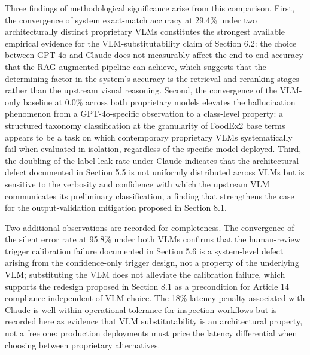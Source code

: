 Three findings of methodological significance arise from this comparison. First, the convergence of system exact-match accuracy at 29.4\% under two architecturally distinct proprietary VLMs constitutes the strongest available empirical evidence for the VLM-substitutability claim of Section 6.2: the choice between GPT-4o and Claude does not measurably affect the end-to-end accuracy that the RAG-augmented pipeline can achieve, which suggests that the determining factor in the system's accuracy is the retrieval and reranking stages rather than the upstream visual reasoning. Second, the convergence of the VLM-only baseline at 0.0\% across both proprietary models elevates the hallucination phenomenon from a GPT-4o-specific observation to a class-level property: a structured taxonomy classification at the granularity of FoodEx2 base terms appears to be a task on which contemporary proprietary VLMs systematically fail when evaluated in isolation, regardless of the specific model deployed. Third, the doubling of the label-leak rate under Claude indicates that the architectural defect documented in Section 5.5 is not uniformly distributed across VLMs but is sensitive to the verbosity and confidence with which the upstream VLM communicates its preliminary classification, a finding that strengthens the case for the output-validation mitigation proposed in Section 8.1.

Two additional observations are recorded for completeness. The convergence of the silent error rate at 95.8\% under both VLMs confirms that the human-review trigger calibration failure documented in Section 5.6 is a system-level defect arising from the confidence-only trigger design, not a property of the underlying VLM; substituting the VLM does not alleviate the calibration failure, which supports the redesign proposed in Section 8.1 as a precondition for Article 14 compliance independent of VLM choice. The 18\% latency penalty associated with Claude is well within operational tolerance for inspection workflows but is recorded here as evidence that VLM substitutability is an architectural property, not a free one: production deployments must price the latency differential when choosing between proprietary alternatives.


